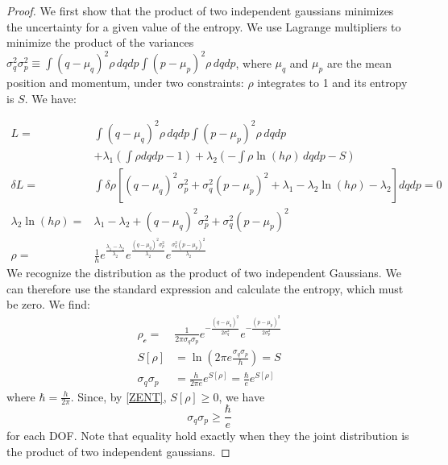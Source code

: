 \documentclass{techbrief}
\begin{document}
\begin{proof}
We first show that the product of two independent gaussians minimizes the uncertainty for a given value of the entropy. We use Lagrange multipliers to minimize the product of the variances $\sigma_q^2 \sigma_p^2 \equiv \int (q-\mu_q)^2 \rho \, dqdp \int (p-\mu_p)^2 \rho \, dqdp$, where $\mu_q$ and $\mu_p$ are the mean position and momentum, under two constraints: $\rho$ integrates to 1 and its entropy is $S$. We have:

\begin{align*}
	L = &\int (q-\mu_q)^2 \rho \, dqdp \int (p-\mu_p)^2 \rho \, dqdp \\
	&+ \lambda_1(\int \rho dqdp - 1) + \lambda_2(- \int \rho \ln (h \rho) \, dqdp - S)\\
	\delta L = &\int \delta \rho [(q-\mu_q)^2 \sigma_p^2 + \sigma_q^2 (p-\mu_p)^2 +  \lambda_1 - \lambda_2 \ln (h \rho) - \lambda_2 ] dqdp = 0 \\
	\lambda_2 \ln (h \rho) = &\lambda_1 - \lambda_2 + (q-\mu_q)^2 \sigma_p^2 + \sigma_q^2 (p-\mu_p)^2 \\
	\rho = &\frac{1}{h} e^{\frac{\lambda_1 - \lambda_2}{\lambda_2}}e^{\frac{(q-\mu_q)^2 \sigma_p^2}{\lambda_2}}e^{\frac{\sigma_q^2 (p-\mu_p)^2}{\lambda_2}}
\end{align*}
We recognize the distribution as the product of two independent Gaussians. We can therefore use the standard expression and calculate the entropy, which must be zero. We find:
\begin{align*}
	\rho_{\mathcal{c}} = &\frac{1}{ 2 \pi \sigma_q \sigma_p} e^{-\frac{(q-\mu_q)^2}{2\sigma_q^2}} e^{-\frac{(p-\mu_p)^2}{2\sigma_p^2}} \\
	S[\rho] &= \ln \left( 2\pi e \frac{\sigma_q\sigma_p}{h}  \right) = S  \\
	\sigma_q \sigma_p &= \frac{h}{2 \pi e} e^{S[\rho]} = \frac{\hbar}{e} e^{S[\rho]}
\end{align*}
where $\hbar = \frac{h}{2\pi}$. Since, by \ref{ZENT}, $S[\rho] \geq 0$, we have
\begin{equation}\label{rp-cm-classicalUncertaintyPrinciple}
	\sigma_q \sigma_p \geq \frac{\hbar}{e}
\end{equation}
for each DOF. Note that equality hold exactly when they the joint distribution is the product of two independent gaussians.


\end{proof}
\end{document}
